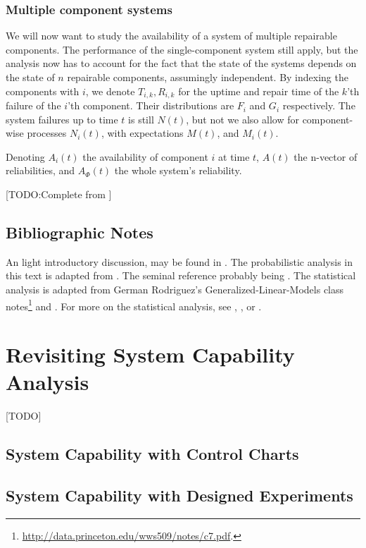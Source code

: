 \documentclass[12pt,a4paper]{report}
\theoremstyle{plain}
\theoremstyle{definition}
\begin{document}
\subsection{Multiple component systems}
We will now want to study the availability of a system of multiple repairable components.
The performance of the single-component system still apply, but the analysis now has to account for the fact that the state of the systems depends on the state of $n$ repairable components, assumingly independent.
By indexing the components with $i$, we denote $T_{i,k}, R_{i,k}$ for the uptime and repair time of the $k$'th failure of the $i$'th component. Their distributions are $F_i$ and $G_i$ respectively.
The system failures up to time $t$ is still $N(t)$, but not we also allow for component-wise processes $N_i(t)$, with expectations $M(t)$, and $M_i(t)$.

Denoting $A_i(t)$ the availability of component $i$ at time $t$, $A(t)$ the n-vector of reliabilities, and $A_\Phi(t)$ the whole system's reliability. 

[TODO:Complete from  \cite[Sec.4.3]{aven_stochastic_1999}]



\section{Bibliographic Notes}
An light introductory discussion, may be found in \cite{nahmias_production_2015}. 
The probabilistic analysis in this text is adapted from \cite{aven_stochastic_1999}.
The seminal reference probably being \cite{barlow_mathematical_1965}.
The statistical analysis is adapted from German Rodriguez's Generalized-Linear-Models class notes\footnote{\url{http://data.princeton.edu/wws509/notes/c7.pdf}.} and \cite[Ch.8]{natrella_nist/sematech_2010}.
For more on the statistical analysis, see \cite{cox_analysis_1984}, \cite{kalbfleisch_statistical_2002}, or \cite{klein_survival_2005}.


% 




\chapter{Revisiting System Capability Analysis}
\label{sec:advanced_capability_analysis}
[TODO]
\section{System Capability with Control Charts}
\section{System Capability with Designed Experiments}
\end{document}
